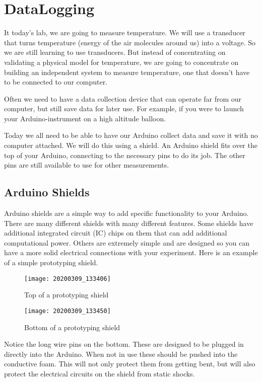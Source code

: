 \chapter{DataLogging}
It today's lab, we are going to measure temperature. We will use a transducer that turns temperature (energy of the air molecules around us) into a voltage. So we are still learning to use transducers. But instead of concentrating on validating a physical model for temperature, we are going to concentrate on building an independent system to measure temperature, one that doesn't have to be connected to our computer.

Often we need to have a data collection device that can operate far from our computer, but still save data for later use. For example, if you were to launch your Arduino-instrument on a high altitude balloon.

Today we all need to be able to have our Arduino collect data and save it with no computer attached. We will do this using a shield. An Arduino shield fits over the top of your Arduino, connecting to the necessary pins to do its job. The other pins are still available to use for other measurements. 

\section{Arduino Shields}
	Arduino shields are a simple way to add specific functionality to your Arduino. There are many different shields with many different features. Some shields have additional integrated circuit (IC) chips on them that can add additional computational power.  Others are extremely simple and are designed so you can have a more solid electrical connections with your experiment.  Here is an example of a simple prototyping shield.
	\begin{figure}[h!] 
		\caption{Top of a prototyping shield}
		\texttt{[image: 20200309\_133406]}
	\end{figure}
	\begin{figure}[h!] 
		\caption{Bottom of a prototyping shield}
		\texttt{[image: 20200309\_133450]}
	\end{figure}
	
	Notice the long wire pins on the bottom. These are designed to be plugged in directly into the Arduino. When not in use these should be pushed into the conductive foam. This will not only protect them from getting bent, but will also protect the electrical circuits on the shield from static shocks.
	

